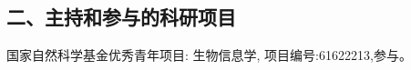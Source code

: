 \vspace{22pt}
\subsection*{二、主持和参与的科研项目}
\ifblindreview
\else
\begin{enumerate}[label={[\arabic*]},itemindent=2em,wide]

    \item 国家自然科学基金优秀青年项目: 生物信息学, 项目编号:61622213,参与。

\end{enumerate}

\fi

\newpage

\ifblindreview
\else

\newpage
\fi